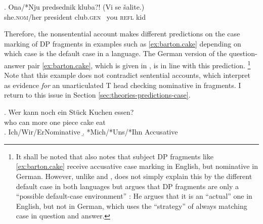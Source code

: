 \exg. Ona/*Nju predsednik kluba?! (Vi se šalite.)\\
she.\textsc{nom}/her president club.\textsc{gen} ~you \textsc{refl} kid\\ 
\hspace{-3em}

Therefore, the nonsentential account makes different predictions on the case marking of DP fragments in examples such as \ref{ex:barton.cake} depending on which case is the default case in a language. The German version of the question-answer pair \ref{ex:barton.cake}, which is given in \Next, is in line with this prediction.%
%
\footnote{It shall be noted that \citet[221]{schutze2001} also notes that subject DP fragments like \ref{ex:barton.cake} receive accusative case marking in English, but nominative in German. However, unlike \citet{barton.progovac2005} and \citet{progovac2006}, \citeauthor{schutze2001} does not simply explain this by the different default case in both languages but argues that DP fragments are only a ``possible default-case environment'' \citep[229]{schutze2001}: He argues that it is an ``actual'' one in English, but not in German, which uses the ``strategy'' of always matching case in question and answer.}\afterfn%
%
Note that this example does not contradict sentential accounts, which interpret \Next as evidence \textit{for} an unarticulated T head checking nominative in fragments. I return to this issue in Section \ref{sec:theories-predictions-case}.

\exg. Wer kann noch ein Stück Kuchen essen?\\
who can more one piece cake eat\\
\a. Ich/Wir/Er\hfill Nominative
\b. *Mich/*Uns/*Ihn \hfill Accusative

